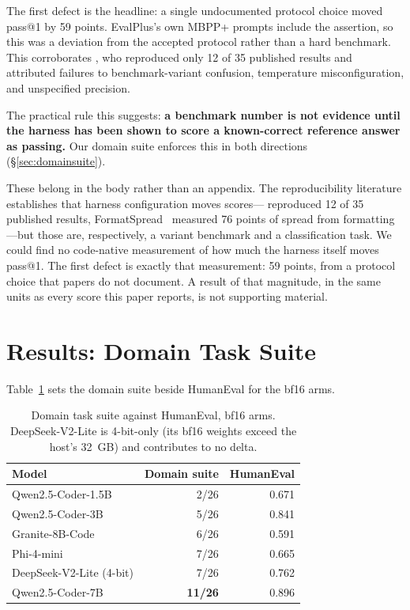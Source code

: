 \documentclass[11pt]{article}
\begin{document}
The first defect is the headline: a single undocumented protocol choice moved pass@1 by
59 points. EvalPlus's own MBPP+ prompts include the assertion, so this was a deviation
from the accepted protocol rather than a hard benchmark. This corroborates
\citet{szalontai2025repro}, who reproduced only 12 of 35 published results and attributed
failures to benchmark-variant confusion, temperature misconfiguration, and unspecified
precision.

The practical rule this suggests: \textbf{a benchmark number is not evidence until the
harness has been shown to score a known-correct reference answer as passing.} Our domain
suite enforces this in both directions (\S\ref{sec:domainsuite}).

These belong in the body rather than an appendix. The reproducibility literature
establishes that harness configuration moves scores---\citet{szalontai2025repro}
reproduced 12 of 35 published results, FormatSpread~\citep{sclar2024formatspread} measured
76 points of spread from formatting---but those are, respectively, a variant benchmark and
a classification task. We could find no code-native measurement of how much the harness
itself moves pass@1. The first defect is exactly that measurement: 59 points, from a
protocol choice that papers do not document. A result of that magnitude, in the same units
as every score this paper reports, is not supporting material.

\section{Results: Domain Task Suite}
\label{sec:domainresults}

Table~\ref{tab:domain} sets the domain suite beside HumanEval for the bf16 arms.

\begin{table}[h]
  \centering
  \caption{Domain task suite against HumanEval, bf16 arms. DeepSeek-V2-Lite is
    4-bit-only (its bf16 weights exceed the host's 32~GB) and contributes to no delta.}
  \label{tab:domain}
  \smallskip
  \begin{tabular}{lrr}
    \toprule
    Model & Domain suite & HumanEval \\
    \midrule
    Qwen2.5-Coder-1.5B        & 2/26  & 0.671 \\
    Qwen2.5-Coder-3B          & 5/26  & 0.841 \\
    Granite-8B-Code           & 6/26  & 0.591 \\
    Phi-4-mini                & 7/26  & 0.665 \\
    DeepSeek-V2-Lite (4-bit)  & 7/26  & 0.762 \\
    Qwen2.5-Coder-7B          & \textbf{11/26} & 0.896 \\
    \bottomrule
  \end{tabular}
\end{table}
\end{document}
